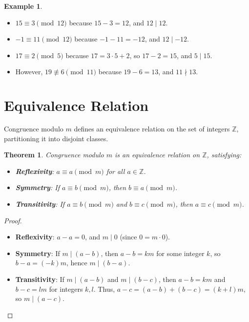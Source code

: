 \documentclass[12pt,openany]{book}
\theoremstyle{definition}
\newtheorem{example}{Example}[chapter]
\theoremstyle{plain}
\newtheorem{theorem}{Theorem}[chapter]
\theoremstyle{remark}
\begin{document}
\begin{example}\mbox{}\\[-0.8em]
  \begin{itemize}
    \item $15 \equiv 3 \pmod{12}$ because $15 - 3 = 12$, and $12 \mid 12$.
    \item $-1 \equiv 11 \pmod{12}$ because $-1 - 11 = -12$, and $12 \mid -12$.
    \item $17 \equiv 2 \pmod{5}$ because $17 = 3 \cdot 5 + 2$, so $17 - 2 = 15$, and $5 \mid 15$.
    \item However, $19 \not\equiv 6 \pmod{11}$ because $19 - 6 = 13$, and $11 \nmid 13$.
  \end{itemize}
\end{example}

\section{Equivalence Relation}

Congruence modulo $m$ defines an equivalence relation on the set of integers $\mathbb{Z}$, partitioning it into disjoint classes.

\begin{theorem}
  Congruence modulo $m$ is an equivalence relation on $\mathbb{Z}$, satisfying:
  \begin{itemize}
    \item \textbf{Reflexivity}: $a \equiv a \pmod{m}$ for all $a \in \mathbb{Z}$.
    \item \textbf{Symmetry}: If $a \equiv b \pmod{m}$, then $b \equiv a \pmod{m}$.
    \item \textbf{Transitivity}: If $a \equiv b \pmod{m}$ and $b \equiv c \pmod{m}$, then $a \equiv c \pmod{m}$.
  \end{itemize}
\end{theorem}

\begin{proof}\mbox{}\\[-0.8em]
  \begin{itemize}
    \item \textbf{Reflexivity}: $a - a = 0$, and $m \mid 0$ (since $0 = m \cdot 0$).
    \item \textbf{Symmetry}: If $m \mid (a - b)$, then $a - b = k m$ for some integer $k$, so $b - a = (-k) m$, hence $m \mid (b - a)$.
    \item \textbf{Transitivity}: If $m \mid (a - b)$ and $m \mid (b - c)$, then $a - b = k m$ and $b - c = l m$ for integers $k, l$. Thus, $a - c = (a - b) + (b - c) = (k + l) m$, so $m \mid (a - c)$.
  \end{itemize}
\end{proof}
\end{document}
